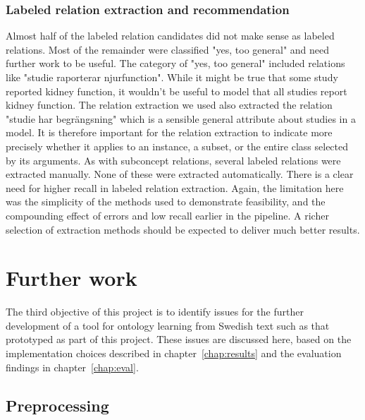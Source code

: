 \documentclass[a4paper]{report}
\begin{document}
\subsection{Labeled relation extraction and recommendation}
\label{subsec:analysis:labeled_rels}

Almost half of the labeled relation candidates did not make sense as labeled relations.
Most of the remainder were classified "yes, too general" and need further work to be useful.
The category of "yes, too general" included relations like "studie raporterar njurfunction".
While it might be true that some study reported kidney function, it wouldn't be useful to model that all studies report kidney function.
The relation extraction we used also extracted the relation "studie har begrängsning" which is a sensible general attribute about studies in a model.
It is therefore important for the relation extraction to indicate more precisely whether it applies to an instance, a subset, or the entire class selected by its arguments.
As with subconcept relations, several labeled relations were extracted manually.
None of these were extracted automatically.
There is a clear need for higher recall in labeled relation extraction.
Again, the limitation here was the simplicity of the methods used to demonstrate feasibility, and the compounding effect of errors and low recall earlier in the pipeline.
A richer selection of extraction methods should be expected to deliver much better results.

\chapter{Further work}
\label{chap:further}

The third objective of this project is to identify issues for the further development of a tool for ontology learning from Swedish text such as that prototyped as part of this project.
These issues are discussed here, based on the implementation choices described in chapter~\ref{chap:results} and the evaluation findings in chapter~\ref{chap:eval}.

\section{Preprocessing}
\end{document}
